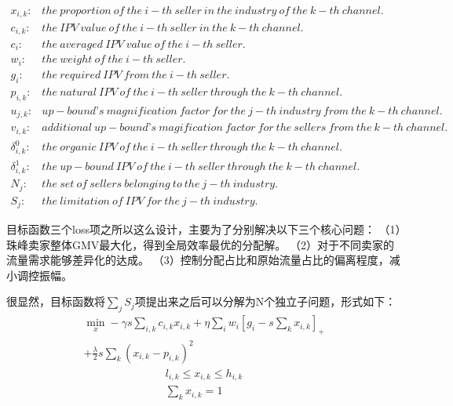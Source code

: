 \begin{align}
x_{i,k}: &the\ proportion\ of\ the\ i-th\ seller\ in\ the\ industry\ of\ the\ k-th\ channel. \\
c_{i,k}: &the\ IPV\ value\ of\ the\ i-th\ seller\ in\ the\ k-th\ channel. \\
c_i: &the\ averaged\ IPV\ value\ of\ the\ i-th\ seller. \\
w_i: &the\ weight\ of\ the\ i-th\ seller. \\
g_i: &the\ required\ IPV\ from\ the\ i-th\ seller. \\
p_{i,k}: &the\ natural\ IPV\ of\ the\ i-th\ seller\ through\ the\ k-th\ channel. \\
u_{j,k}: &up-bound’s\ magnification\ factor\ for\ the\ j-th\ industry\ from\ the\ k-th\ channel. \\
v_{i,k}: &additional\ up-bound’s\ magification\ factor\ for\ the\ sellers\ from\ the\ k-th\ channel. \\
\delta_{i,k}^0: &the\ organic\ IPV\ of\ the\ i-th\ seller\ through\ the\ k-th\ channel. \\
\delta_{i,k}^1: &the\ up-bound\ IPV\ of\ the\ i-th\ seller\ through\ the\ k-th\ channel. \\
N_j: &the\ set\ of\ sellers\ belonging\ to\ the\ j-th\ industry. \\
S_j: &the\ limitation\ of\ IPV\ for\ the\ j-th\ industry.
\end{align}

目标函数三个loss项之所以这么设计，主要为了分别解决以下三个核心问题：
（1）珠峰卖家整体GMV最大化，得到全局效率最优的分配解。
（2）对于不同卖家的流量需求能够差异化的达成。
（3）控制分配占比和原始流量占比的偏离程度，减小调控振幅。

很显然，目标函数将$\sum_jS_j$项提出来之后可以分解为N个独立子问题，形式如下：
\begin{align}
\min_x - \gamma s\sum_{i,k} c_{i,k} x_{i,k}  + \eta \sum_i w_i  \left [g_i - s\sum_k x_{i,k} \right]_{+} \\
+ \frac{\lambda}{2} s \sum_k(x_{i,k}-p_{i,k})^2 
\end{align}
\begin{align}
l_{i,k} \leq x_{i,k} \leq h_{i,k} \\
\sum_k x_{i,k}=1 
\end{align}

